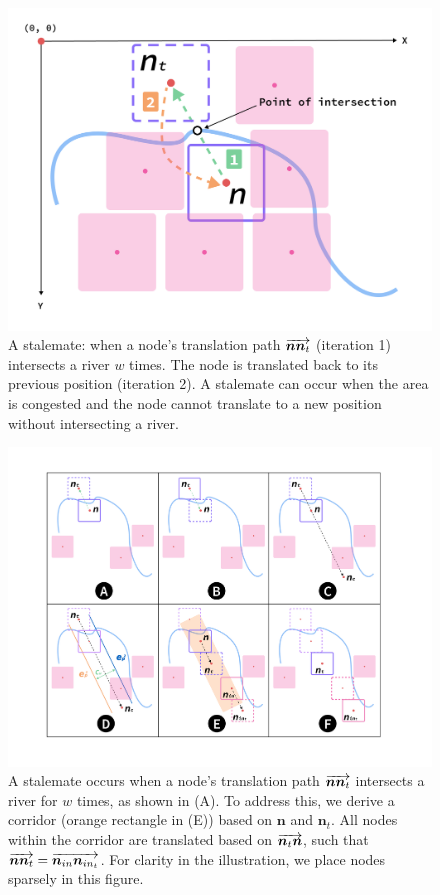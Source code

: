 \documentclass[Afour,sagev,times]{sagej}
\newcommand{\Vector}[1]{\protect\overrightarrow{#1}}
\newcommand{\stalemateMax}{w}
\newcommand{\node}{\bm{n}}
\newcommand{\nodeFNOR}{\node_t}
\newcommand{\nodeVectorTC}{\Vector{\nodeFNOR\node}}
\newcommand{\nodeVectorCT}{\Vector{\node\nodeFNOR}}
\newcommand{\nodeInCorridor}{\node_{in}}
\newcommand{\nodeInCorridorT}{\node_{in_t}}
\newcommand{\nodeVectorNNn}{\Vector{\node\node_{t}}}
\newcommand{\nodeVectorNinNinn}{\Vector{\nodeInCorridor\nodeInCorridorT}}
\begin{document}
{
\begin{figure}[tb!]
    \centering
    \includegraphics[width=\columnwidth,keepaspectratio]{stalemate.png}
    \caption{A stalemate: when a node's translation path $ \nodeVectorCT $ (iteration 1) intersects a river $ \stalemateMax $ times. The node is translated back to its previous position (iteration 2). A stalemate can occur when the area is congested and the node cannot translate to a new position without intersecting a river.}
    \label{fig:stalemate}
\end{figure}
}

{
\begin{figure}[tb!]
    \centering
    \includegraphics[width=\columnwidth,keepaspectratio]{corridor.png}
    \caption{A stalemate occurs when a node's translation path $ \nodeVectorCT $ intersects a river for $ \stalemateMax $ times, as shown in (A). To address this, we derive a corridor (orange rectangle in (E)) based on $ \node $ and $ \nodeFNOR $. All nodes within the corridor are translated based on $ \nodeVectorTC $, such that $ \nodeVectorNNn = \nodeVectorNinNinn $. For clarity in the illustration, we place nodes sparsely in this figure.}
    \label{fig:corridor}
\end{figure}
}
\end{document}

